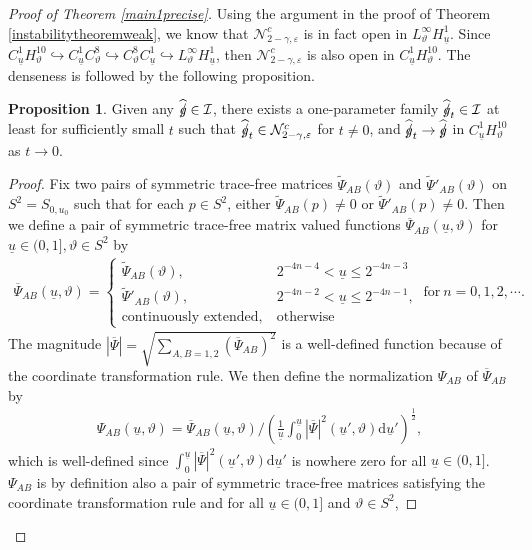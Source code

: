 \documentclass[11pt,reqno]{amsart}
\theoremstyle{definition}
\newtheorem{proposition}{Proposition}[section]
\numberwithin{equation}{section}
\newcommand{\D}{\mathrm{d}}
\def\ub{\underline{u}}
\def\gs{\mbox{$g \mkern -9mu /$}}
\begin{document}
\begin{proof}[Proof of Theorem \ref{main1precise}]
Using the argument in the proof of Theorem \ref{instabilitytheoremweak}, we know that $\mathcal{N}_{2-\gamma,\varepsilon}^c$ is in fact open in $L^\infty_\vartheta H^1_{\ub}$. Since $C^1_{\ub}H^{10}_\vartheta\hookrightarrow C^1_{\ub}C^8_\vartheta\hookrightarrow C^8_\vartheta C^1_{\ub}\hookrightarrow L^\infty_\vartheta H^1_{\ub}$, then $\mathcal{N}_{2-\gamma,\varepsilon}^c$ is also open in $C^1_{\ub}H^{10}_\vartheta$. The denseness is followed by the following proposition.
\begin{proposition}\label{dense}Given any $\widehat{\gs}\in\mathcal{I}$, there exists a one-parameter family $\widehat{\gs}_t\in\mathcal{I}$ at least for sufficiently small $t$ such that $\widehat{\gs}_t\in\mathcal{N}_{2-\gamma,\varepsilon}^c$ for $t\ne0$, and $\widehat{\gs}_t\to\widehat{\gs}$ in $C^1_{\ub}H^{10}_\vartheta$ as $t\to0$.\end{proposition}
\begin{proof}
Fix two pairs of symmetric trace-free matrices $\widetilde{\Psi}_{AB}(\vartheta)$ and $\widetilde{\Psi}'_{AB}(\vartheta)$ on $S^2=S_{0,u_0}$ such that for each $p\in S^2$, either $\widetilde{\Psi}_{AB}(p)\ne0$ or $\widetilde{\Psi}'_{AB}(p)\ne0$. Then we define a pair of symmetric trace-free matrix valued functions $\overline{\Psi}_{AB}(\ub,\vartheta)$ for $\ub\in(0,1],\vartheta\in S^2$ by
\begin{align*}
\overline{\Psi}_{AB}(\ub,\vartheta)=\begin{cases}\widetilde{\Psi}_{AB}(\vartheta),\ &2^{-4n-4}<\ub\le2^{-4n-3}\\\widetilde{\Psi}'_{AB}(\vartheta),\ &2^{-4n-2}<\ub\le2^{-4n-1},\\\text{continuously extended},\ &\text{otherwise} \end{cases}\ \text{for}\ n=0,1,2,\cdots.
\end{align*}
The magnitude  $|\overline{\Psi}|=\sqrt{\sum_{A,B=1,2}(\overline{\Psi}_{AB})^2}$ is a well-defined function because of the coordinate transformation rule. We then define the normalization $\Psi_{AB}$ of $\overline{\Psi}_{AB}$ by
\begin{align}\label{def-Psi}
\Psi_{AB}(\ub,\vartheta)=\overline{\Psi}_{AB}(\ub,\vartheta)\Bigg/\left(\frac{1}{\ub}\int_0^{\ub}|\overline{\Psi}|^2(\ub',\vartheta)\D\ub'\right)^{\frac{1}{2}},
\end{align}
which is well-defined since $\int_0^{\ub}|\overline{\Psi}|^2(\ub',\vartheta)\D\ub'$ is nowhere zero for all $\ub\in(0,1]$. $\Psi_{AB}$ is by definition also a pair of symmetric trace-free matrices satisfying the coordinate transformation rule and for all $\ub\in(0,1]$ and $\vartheta\in S^2$,

\end{proof}
\end{proof}
\end{document}
